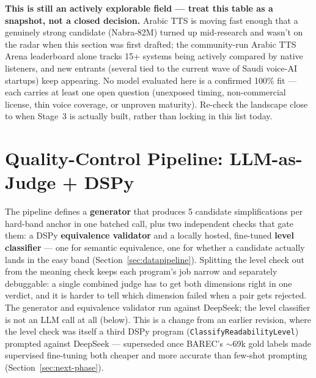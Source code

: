 \documentclass[11pt,a4paper]{article}
\begin{document}
\begin{noteb}
\textbf{This is still an actively explorable field --- treat this table as a
snapshot, not a closed decision.} Arabic TTS is moving fast enough that a
genuinely strong candidate (Nabra-82M) turned up mid-research and wasn't on
the radar when this section was first drafted; the community-run Arabic TTS
Arena leaderboard alone tracks 15+ systems being actively compared by native
listeners, and new entrants (several tied to the current wave of Saudi
voice-AI startups) keep appearing. No model evaluated here is a confirmed
100\% fit --- each carries at least one open question (unexposed timing,
non-commercial license, thin voice coverage, or unproven maturity). Re-check
the landscape close to when Stage~3 is actually built, rather than locking
in this list today.
\end{noteb}

\newpage
\section{Quality-Control Pipeline: LLM-as-Judge + DSPy}
\label{sec:qc}

The pipeline defines a \textbf{generator} that produces 5 candidate
simplifications per hard-band anchor in one batched call, plus two
independent checks that gate them: a DSPy \textbf{equivalence validator}
and a locally hosted, fine-tuned \textbf{level classifier} --- one for
semantic equivalence, one for whether a candidate actually lands in the
easy band (Section~\ref{sec:datapipeline}). Splitting the level check out
from the meaning check keeps each program's job narrow and separately
debuggable: a single combined judge has to get both dimensions right in one
verdict, and it is harder to tell which dimension failed when a pair gets
rejected. The generator and equivalence validator run against DeepSeek; the
level classifier is not an LLM call at all (below). This is a change from
an earlier revision, where the level check was itself a third DSPy program
(\texttt{ClassifyReadabilityLevel}) prompted against DeepSeek --- superseded
once BAREC's $\sim$69k gold labels made supervised fine-tuning both cheaper
and more accurate than few-shot prompting (Section~\ref{sec:next-phase}).
\end{document}

